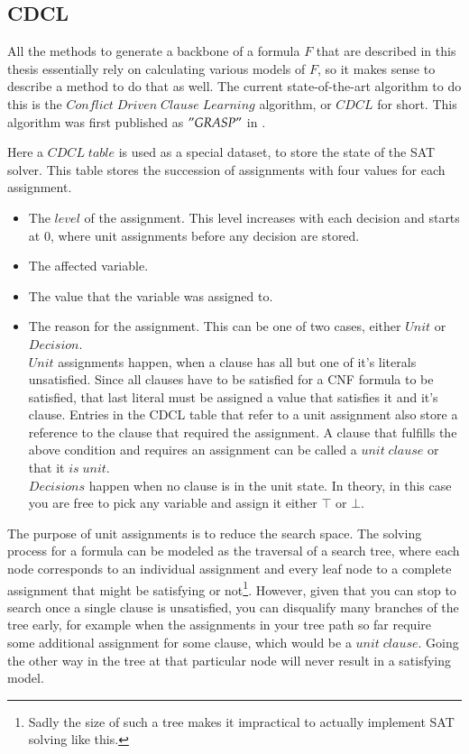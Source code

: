 \subsection{CDCL}
\label{ss:cdcl}
All the methods to generate a backbone of a formula $F$ that are described in this thesis essentially rely on calculating various models of $F$, so it makes sense to describe a method to do that as well. The current state-of-the-art algorithm to do this is the $Conflict\;Driven\;Clause\;Learning$ algorithm, or $CDCL$ for short. This algorithm was first published as $"GRASP"$ in \cite{GRASP}.

Here a $CDCL\;table$ is used as a special dataset, to store the state of the SAT solver. This table stores the succession of assignments with four values for each assignment.
\begin{itemize}
\item The $level$ of the assignment. This level increases with each decision and starts at 0, where unit assignments before any decision are stored.
\item The affected variable.
\item The value that the variable was assigned to.
\item The reason for the assignment. This can be one of two cases, either $Unit$ or $Decision$. 
\\
$Unit$ assignments happen, when a clause has all but one of it's literals unsatisfied. Since all clauses have to be satisfied for a CNF formula to be satisfied, that last literal must be assigned a value that satisfies it and it's clause. Entries in the CDCL table that refer to a unit assignment also store a reference to the clause that required the assignment. A clause that fulfills the above condition and requires an assignment can be called a $unit\; clause$ or that it $is\; unit$.
\\
$Decisions$ happen when no clause is in the unit state. In theory, in this case you are free to pick any variable and assign it either $\top$ or $\bot$. 
\end{itemize}

The purpose of unit assignments is to reduce the search space. The solving process for a formula can be modeled as the traversal of a search tree, where each node corresponds to an individual assignment and every leaf node to a complete assignment that might be satisfying or not\footnote
{
	Sadly the size of such a tree makes it impractical to actually implement SAT solving like this.
}. However, given that you can stop to search once a single clause is unsatisfied, you can disqualify many branches of the tree early, for example when the assignments in your tree path so far require some additional assignment for some clause, which would be a $unit\; clause$. Going the other way in the tree at that particular node will never result in a satisfying model.

